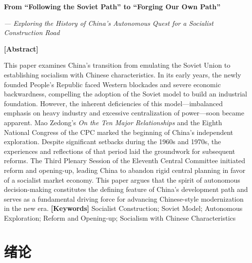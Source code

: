 \documentclass[12pt, a4paper]{ctexart}
\numberwithin{table}{section}
\numberwithin{figure}{section}
\begin{document}
\vspace{1.5em}

\begin{abstractbox}
    {
    \centerline{\textbf{From ``Following the Soviet Path'' to ``Forging Our Own Path''}}
    \vspace{0.2em}
    \centerline{\textit{--- Exploring the History of China's Autonomous Quest for a Socialist Construction Road}}
    \vspace{0.5em}
    \centerline{\textbf{[Abstract]}}
    \vspace{0.3em}
    { This paper examines China's transition from emulating the Soviet Union to establishing socialism with Chinese characteristics. In its early years, the newly founded People's Republic faced Western blockades and severe economic backwardness, compelling the adoption of the Soviet model to build an industrial foundation. However, the inherent deficiencies of this model---imbalanced emphasis on heavy industry and excessive centralization of power---soon became apparent. Mao Zedong's \textit{On the Ten Major Relationships} and the Eighth National Congress of the CPC marked the beginning of China's independent exploration. Despite significant setbacks during the 1960s and 1970s, the experiences and reflections of that period laid the groundwork for subsequent reforms. The Third Plenary Session of the Eleventh Central Committee initiated reform and opening-up, leading China to abandon rigid central planning in favor of a socialist market economy. This paper argues that the spirit of autonomous decision-making constitutes the defining feature of China's development path and serves as a fundamental driving force for advancing Chinese-style modernization in the new era.}
    \vspace{0.5em}
    \newline
    \textbf{[Keywords]} Socialist Construction; Soviet Model; Autonomous Exploration; Reform and Opening-up; Socialism with Chinese Characteristics
    }
\end{abstractbox}
\vspace{1em}
\newpage
{}  %
\pagestyle{frontmatter}
\tableofcontents

\newpage
\listoffigures
\vspace{2em}
\listoftables
\newpage

\pagestyle{fancy}
\songti {}

\section{绪论}
\end{document}

